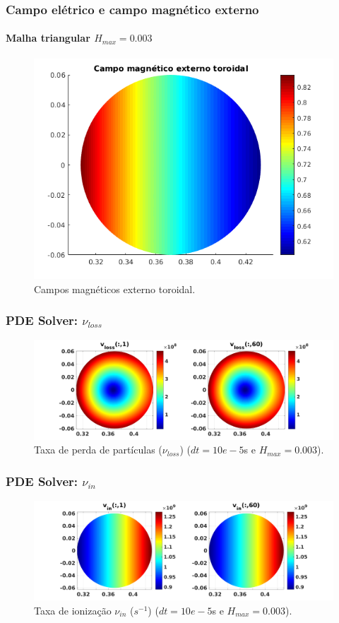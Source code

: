 \documentclass[aspectratio=169]{beamer}
\begin{document}
\begin{frame}
			\frametitle{Campo elétrico e campo magnético externo}
		\framesubtitle{Malha triangular $H_{max}=0.003$}
\begin{figure}[H]
\begin{center}
\includegraphics[scale=0.5]{../SImulacao_breakdown/PDE/CampoMagext.png} 
 \caption{Campos magnéticos externo toroidal.}
\end{center}
\end{figure}	
\end{frame}	

	
	\begin{frame}
		\frametitle{PDE Solver: $\nu_{loss}$}
			\begin{figure}[H]
\centering
\includegraphics[width=.9\linewidth]{../SImulacao_breakdown/PDE/vinl1.png}  
\caption{Taxa de perda de partículas ($\nu_{loss}$)  ($dt=10e-5$s e $H_{max} = 0.003$).}
\label{vinn1}
\end{figure}
\end{frame}
	
	\begin{frame}
			\frametitle{PDE Solver: $\nu_{in}$}
\begin{figure}[H]
\centering
\includegraphics[width=.9\linewidth]{../SImulacao_breakdown/PDE/vinv1.png}  
\caption{Taxa de ionização $\nu_{in}$ ($s^{-1}$) ($dt=10e-5$s e $H_{max} = 0.003$).}
\label{vinn2}
\end{figure}
\end{frame}
	
\end{document}

